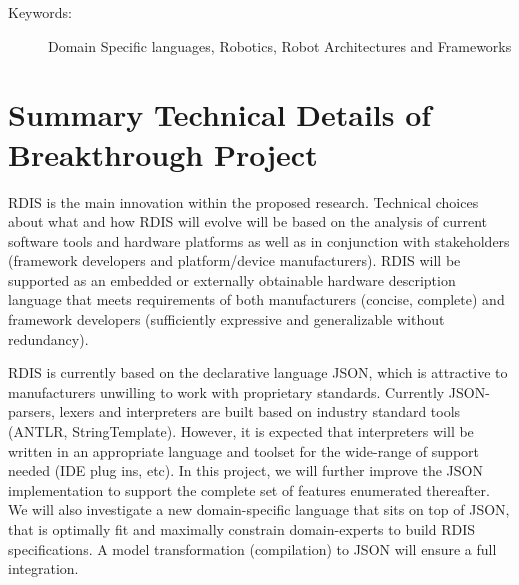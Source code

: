 \begin{description}
	\item[Keywords:]
   Domain Specific languages, Robotics, Robot Architectures and Frameworks
\end{description}


\newpage

\section*{Summary Technical Details of Breakthrough Project}

RDIS is the main innovation within the proposed research.  Technical choices about what and how RDIS will evolve will be based on the analysis of current software tools and hardware platforms as well as in conjunction with stakeholders (framework developers and platform/device manufacturers).  RDIS will be supported as an embedded or externally obtainable hardware description language that meets requirements of both manufacturers (concise, complete) and framework developers (sufficiently expressive and generalizable without redundancy).

RDIS is currently based on the declarative language JSON, which is attractive to manufacturers unwilling to work with proprietary standards. Currently JSON-parsers, lexers and interpreters are built based on industry standard tools (ANTLR, StringTemplate).  However, it is expected that interpreters will be written in an appropriate language and toolset for the wide-range of support needed (IDE plug ins, etc).
In this project, we will further improve the JSON implementation to support the complete set of features enumerated thereafter.
We will also investigate a new domain-specific language that sits on top of JSON, that is optimally fit and maximally constrain domain-experts to build RDIS specifications.
A model transformation (compilation) to JSON will ensure a full integration.


